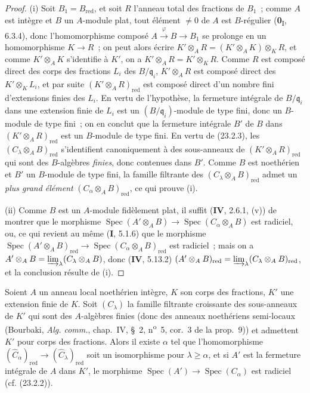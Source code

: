 \begin{proof}
(i) Soit $B_1=B_{\mathrm{red}}$, et soit $R$ l'anneau total des
fractions de $B_1$~; comme $A$ est intègre et $B$ un $A$-module plat, tout
élément $\neq0$ de $A$ est $B$-régulier (\textbf{0}\textsubscript{I}, 6.3.4), donc
l'homomorphisme composé $A\xrightarrow{\varphi}B\to B_1$ se prolonge en un
homomorphisme $K\to R$~; on peut alors écrire
$K'\otimes_AR=(K'\otimes_AK)\otimes_KR$, et comme $K'\otimes_AK$
s'identifie à $K'$, on a $K'\otimes_AR=K'\otimes_KR$. Comme $R$ est composé
direct des corps des fractions $L_i$ des $B/\mathfrak q_i$,
$K'\otimes_AR$ est composé direct des $K'\otimes_KL_i$, et par suite
$(K'\otimes_AR)_{\mathrm{red}}$ est composé direct d'un nombre fini
d'extensions finies des $L_i$. En vertu de l'hypothèse, la fermeture
intégrale de $B/\mathfrak q_i$ dans une extension finie de $L_i$ est un
$(B/\mathfrak q_i)$-module de type fini, donc un $B$-module de type fini~;
on en conclut que la fermeture intégrale $B'$ de $B$ dans
$(K'\otimes_AR)_{\mathrm{red}}$ est un $B$-module de type fini. En vertu de
(23.2.3), les $(C_\lambda\otimes_AB)_{\mathrm{red}}$ s'identifient
canoniquement à des sous-anneaux de $(K'\otimes_AR)_{\mathrm{red}}$ qui sont
des $B$-algèbres \emph{finies}, donc contenues dans $B'$. Comme $B$ est noethérien
et $B'$ un $B$-module de type fini, la famille filtrante des
$(C_\lambda\otimes_AB)_{\mathrm{red}}$ admet un \emph{plus grand élément}
$(C_\alpha\otimes_AB)_{\mathrm{red}}$, ce qui prouve (i).

(ii) Comme $B$ est un $A$-module fidèlement plat, il suffit
(\textbf{IV}, 2.6.1, (v)) de montrer que le morphisme
$\operatorname{Spec}(A'\otimes_AB)\to
\operatorname{Spec}(C_\alpha\otimes_AB)$ est radiciel, ou, ce qui revient au
même (\textbf{I}, 5.1.6) que le morphisme
$\operatorname{Spec}(A'\otimes_AB)_{\mathrm{red}}\to
\operatorname{Spec}(C_\alpha\otimes_AB)_{\mathrm{red}}$ est radiciel~; mais
on a $A'\otimes_AB=\varinjlim_\lambda(C_\lambda\otimes_AB)$, donc
(\textbf{IV}, 5.13.2)
$(A'\otimes_AB)_{\mathrm{red}}=
\varinjlim_\lambda(C_\lambda\otimes_AB)_{\mathrm{red}}$, et la conclusion
résulte de (i).
\end{proof}

\begin{corollary}[23.2.5]
\label{0.23.2.5-fr}
Soient $A$ un anneau local noethérien intègre, $K$ son corps des fractions,
$K'$ une extension finie de $K$. Soit $(C_\lambda)$ la famille filtrante
croissante des sous-anneaux de $K'$ qui sont des $A$-algèbres finies \textup{(donc
des anneaux noethériens semi-locaux (Bourbaki, \emph{Alg. comm.}, chap.~IV,
§~2, n\textsuperscript{o}~5, cor.~3 de la prop.~9))} et admettent $K'$ pour
corps des fractions. Alors il existe $\alpha$ tel que l'homomorphisme
$(\widehat C_\alpha)_{\mathrm{red}}\to
(\widehat C_\lambda)_{\mathrm{red}}$ soit un isomorphisme pour
$\lambda\geqslant\alpha$, et si $A'$ est la fermeture intégrale de $A$ dans
$K'$, le morphisme
$\operatorname{Spec}(A')\to\operatorname{Spec}(C_\alpha)$ est radiciel
\textup{(cf. (23.2.2))}.
\end{corollary}

